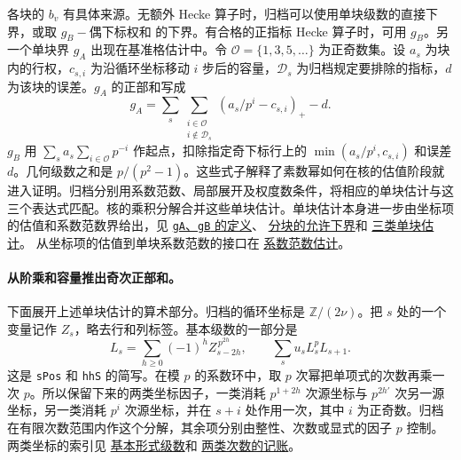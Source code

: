 \documentclass[UTF8,fontset=none,a4paper,11pt]{ctexart}
\theoremstyle{definition}
\newcommand{\src}[3]{\href{https://github.com/leanprover-community/riemann-hypothesis/blob/23aebbb302010b292314d406aa97f7901d698634/src/#1.lean\#L#2}{#3}}
\begin{document}
各块的 \(b_v\) 有具体来源。无额外 Hecke 算子时，归档可以使用单块级数的直接下界，或取 \(g_B-\text{偶下标权和}\) 的下界。有合格的正指标 Hecke 算子时，可用 \(g_B\)。另一个单块界 \(g_A\) 出现在基准格估计中。令 $\mathcal O=\{1,3,5,\ldots\}$ 为正奇数集。设 \(a_s\) 为块内的行权，\(c_{s,i}\) 为沿循环坐标移动 \(i\) 步后的容量，\(\mathcal D_s\) 为归档规定要排除的指标，\(d\) 为该块的误差。\(g_A\) 的正部和写成
\[
 g_A=\sum_s\sum_{\substack{i\in\mathcal O\\i\notin\mathcal D_s}}
            (a_s/p^i-c_{s,i})_+-d .
\]
\(g_B\) 用 \(\sum_s a_s\sum_{i\in\mathcal O}p^{-i}\) 作起点，扣除指定奇下标行上的 \(\min(a_s/p^i,c_{s,i})\) 和误差 \(d\)。几何级数之和是 \(p/(p^2-1)\)。这些式子解释了素数幂如何在核的估值阶段就进入证明。归档分别用系数范数、局部展开及权度数条件，将相应的单块估计与这三个表达式匹配。核的乘积分解合并这些单块估计。单块估计本身进一步由坐标项的估值和系数范数界给出，见
\src{Formalism/SharpRestriction/GrowthBounds/FormalGroupSystem}{57}{\texttt{gA}、\texttt{gB} 的定义}、
\src{Formalism/SharpRestriction/GrowthBounds/MultisetValuation/PlaceB}{27}{分块的允许下界}和
\src{Formalism/SharpRestriction/GrowthBounds/MultisetValuation/FirstTheoremPlaceBound}{20}{三类单块估计}。
从坐标项的估值到单块系数范数的接口在
\src{Formalism/ThetaLogCoordinates/UniformThetaSubstitution/FrobeniusLiftNorms/EGaussK}{150}{系数范数估计}。

\paragraph{从阶乘和容量推出奇次正部和。}
下面展开上述单块估计的算术部分。归档的循环坐标是 $\mathbb Z/(2\nu)$。把 $s$ 处的一个变量记作 $Z_s$，略去行和列标签。基本级数的一部分是
\[
 L_s=\sum_{h\ge0}(-1)^h Z_{s-2h}^{\,p^{2h}},\qquad
 \sum_s u_s L_s^pL_{s+1}.
\]
这是 \texttt{sPos} 和 \texttt{hhS} 的简写。在模 $p$ 的系数环中，取 $p$ 次幂把单项式的次数再乘一次 $p$。所以保留下来的两类坐标因子，一类消耗 \(p^{1+2h}\) 次源坐标与 \(p^{2h'}\) 次另一源坐标，另一类消耗 \(p^i\) 次源坐标，并在 \(s+i\) 处作用一次，其中 \(i\) 为正奇数。归档在有限次数范围内作这个分解，其余项分别由整性、次数或显式的因子 \(p\) 控制。两类坐标的索引见
\src{Formalism/ThetaLogCoordinates/UniformThetaSubstitution/CyclicPowerClassOfExpEquiv}{81}{基本形式级数}和
\src{Formalism/ThetaLogCoordinates/UniformThetaSubstitution/StatementE}{106}{两类次数的记账}。
\end{document}

